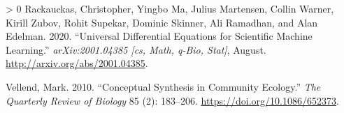 \documentclass[10pt,oneside]{article}
\newlength{\cslhangindent}
\newenvironment{CSLReferences}[3] %
 {%
  \setlength{\parindent}{0pt}
  \ifodd #1 \everypar{\setlength{\hangindent}{\cslhangindent}}\ignorespaces\fi
  \ifnum #2 > 0
  \setlength{\parskip}{#2\baselineskip}
  \fi
 }%
 {}
\begin{document}
\begin{CSLReferences}{1}{0}
\leavevmode\hypertarget{ref-Rackauckas2020UniDif}{}%
Rackauckas, Christopher, Yingbo Ma, Julius Martensen, Collin Warner,
Kirill Zubov, Rohit Supekar, Dominic Skinner, Ali Ramadhan, and Alan
Edelman. 2020. {``Universal Differential Equations for Scientific
Machine Learning.''} \emph{arXiv:2001.04385 {[}cs, Math, q-Bio,
Stat{]}}, August. \url{http://arxiv.org/abs/2001.04385}.

\leavevmode\hypertarget{ref-Vellend2010ConSyn}{}%
Vellend, Mark. 2010. {``Conceptual Synthesis in Community Ecology.''}
\emph{The Quarterly Review of Biology} 85 (2): 183--206.
\url{https://doi.org/10.1086/652373}.

\end{CSLReferences}
\end{document}
